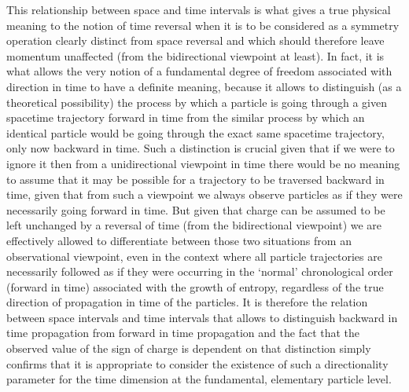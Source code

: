 \documentclass[notitlepage,12pt]{report}
\begin{document}
This relationship between space and time intervals is what gives a true physical meaning to the notion of time reversal when it is to be considered as a symmetry operation clearly distinct from space reversal and which should therefore leave momentum unaffected (from the bidirectional viewpoint at least). In fact, it is what allows the very notion of a fundamental degree of freedom associated with direction in time to have a definite meaning, because it allows to distinguish (as a theoretical possibility) the process by which a particle is going through a given spacetime trajectory forward in time from the similar process by which an identical particle would be going through the exact same spacetime trajectory, only now backward in time. Such a distinction is crucial given that if we were to ignore it then from a unidirectional viewpoint in time there would be no meaning to assume that it may be possible for a trajectory to be traversed backward in time, given that from such a viewpoint we always observe particles as if they were necessarily going forward in time. But given that charge can be assumed to be left unchanged by a reversal of time (from the bidirectional viewpoint) we are effectively allowed to differentiate between those two situations from an observational viewpoint, even in the context where all particle trajectories are necessarily followed as if they were occurring in the `normal' chronological order (forward in time) associated with the growth of entropy, regardless of the true direction of propagation in time of the particles. It is therefore the relation between space intervals and time intervals that allows to distinguish backward in time propagation from forward in time propagation and the fact that the observed value of the sign of charge is dependent on that distinction simply confirms that it is appropriate to consider the existence of such a directionality parameter for the time dimension at the fundamental, elementary particle level.
\end{document}
